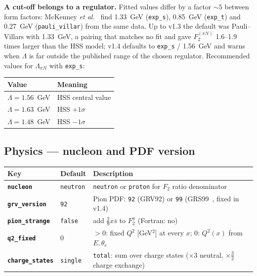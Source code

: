 \documentclass[11pt,a4paper]{article}
\newcommand{\inikey}[1]{\texttt{\textbf{#1}}}
\begin{document}
\textbf{A cut-off belongs to a regulator.}  Fitted values differ by a
factor $\sim5$ between form factors: McKenney \textit{et al.}~\cite{McK16}
find 1.33~GeV (\texttt{exp\_s}), 0.85~GeV (\texttt{exp\_t}) and 0.27~GeV
(\texttt{pauli\_villar}) from the same data.  Up to v1.3 the default was
Pauli--Villars with 1.33~GeV, a pairing that matches no fit and gave
$F_2^{(\pi N)}$ 1.6--1.9 times larger than the HSS model; v1.4 defaults to
\texttt{exp\_s} / 1.56~GeV and warns when $\Lambda$ is far outside the
published range of the chosen regulator.  Recommended values for $\Lambda_{\pi N}$
with \texttt{exp\_s}:
\begin{center}
\begin{tabular}{ll}
\toprule
\textbf{Value} & \textbf{Meaning} \\
\midrule
$\Lambda = 1.56$~GeV & HSS central value \\
$\Lambda = 1.63$~GeV & HSS $+1\sigma$ \\
$\Lambda = 1.48$~GeV & HSS $-1\sigma$ \\
\bottomrule
\end{tabular}
\end{center}

\subsection{Physics --- nucleon and PDF version}

\begin{center}
\begin{tabular}{lll}
\toprule
\textbf{Key} & \textbf{Default} & \textbf{Description} \\
\midrule
\inikey{nucleon}      & \texttt{neutron} & \texttt{neutron} or \texttt{proton} for $F_2$ ratio denominator \\
\inikey{grv\_version} & \texttt{92}      & Pion PDF: \texttt{92} (GRV92) or \texttt{99} (GRS99~\cite{GRS99}, fixed in v1.4) \\
\inikey{pion\_strange} & \texttt{false}  & add $\tfrac29 x\bar s$ to $F_2^\pi$ (Fortran: no) \\
\inikey{q2\_fixed}    & 0               & $>0$: fixed $Q^2$ [GeV$^2$] at every $x$; 0: $Q^2(x)$ from $E,\theta_e$ \\
\inikey{charge\_states} & \texttt{single} & \texttt{total}: sum over charge states ($\times3$ neutral, $\times\tfrac32$ charge exchange) \\
\bottomrule
\end{tabular}
\end{center}
\end{document}
